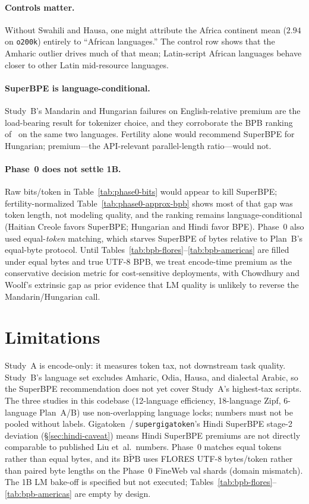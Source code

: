 \documentclass[11pt,a4paper]{article}
\begin{document}
\paragraph{Controls matter.}
Without Swahili and Hausa, one might attribute the Africa continent mean ($2.94$ on \texttt{o200k}) entirely to ``African languages.''
The control row shows that the Amharic outlier drives much of that mean; Latin-script African languages behave closer to other Latin mid-resource languages.

\paragraph{SuperBPE is language-conditional.}
Study~B's Mandarin and Hungarian failures on English-relative premium are the load-bearing result for tokenizer choice, and they corroborate the BPB ranking of~\citet{chowdhury-woolf-2026-benchmarking} on the same two languages.
Fertility alone would recommend SuperBPE for Hungarian; premium---the API-relevant parallel-length ratio---would not.

\paragraph{Phase~0 does not settle 1B.}
Raw bits/token in Table~\ref{tab:phase0-bits} would appear to kill SuperBPE; fertility-normalized Table~\ref{tab:phase0-approx-bpb} shows most of that gap was token length, not modeling quality, and the ranking remains language-conditional (Haitian Creole favors SuperBPE; Hungarian and Hindi favor BPE).
Phase~0 also used equal-\emph{token} matching, which starves SuperBPE of bytes relative to Plan~B's equal-byte protocol.
Until Tables~\ref{tab:bpb-flores}--\ref{tab:bpb-americas} are filled under equal bytes and true UTF-8 BPB, we treat encode-time premium as the conservative decision metric for cost-sensitive deployments, with Chowdhury and Woolf's extrinsic gap as prior evidence that LM quality is unlikely to reverse the Mandarin/Hungarian call.

\section{Limitations}
\label{sec:limitations}

Study~A is encode-only: it measures token tax, not downstream task quality.
Study~B's language set excludes Amharic, Odia, Hausa, and dialectal Arabic, so the SuperBPE recommendation does not yet cover Study~A's highest-tax scripts.
The three studies in this codebase (12-language efficiency, 18-language Zipf, 6-language Plan~A/B) use non-overlapping language locks; numbers must not be pooled without labels.
Gigatoken~/\,\texttt{supergigatoken}'s Hindi SuperBPE stage-2 deviation (\S\ref{sec:hindi-caveat}) means Hindi SuperBPE premiums are not directly comparable to published Liu et~al.\ numbers.
Phase~0 matches equal tokens rather than equal bytes, and its $\widetilde{\mathrm{BPB}}$ uses FLORES UTF-8 bytes/token rather than paired byte lengths on the Phase~0 FineWeb val shards (domain mismatch).
The 1B LM bake-off is specified but not executed; Tables~\ref{tab:bpb-flores}--\ref{tab:bpb-americas} are empty by design.
\end{document}
